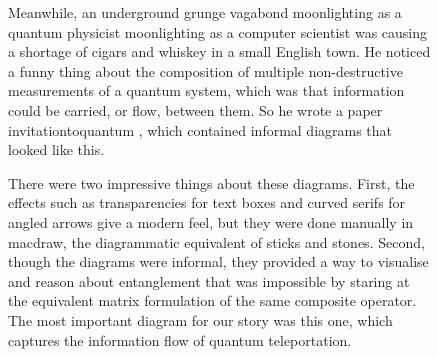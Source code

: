 \begin{figure}[h!]
\centering
{}
\caption{Meanwhile, an underground grunge vagabond moonlighting as a quantum physicist moonlighting as a computer scientist was causing a shortage of cigars and whiskey in a small English town. He noticed a funny thing about the composition of multiple non-destructive measurements of a quantum system, which was that information could be carried, or flow, between them. So he wrote a paper \bR invitationtoquantum \e, which contained informal diagrams that looked like this.}
\end{figure}

\begin{figure}[h!]
\centering
{}
\caption{There were two impressive things about these diagrams. First, the effects such as transparencies for text boxes and curved serifs for angled arrows give a modern feel, but they were done manually in macdraw, the diagrammatic equivalent of sticks and stones. Second, though the diagrams were informal, they provided a way to visualise and reason about entanglement that was impossible by staring at the equivalent matrix formulation of the same composite operator. The most important diagram for our story was this one, which captures the information flow of quantum teleportation.}
\end{figure}
\clearpage

